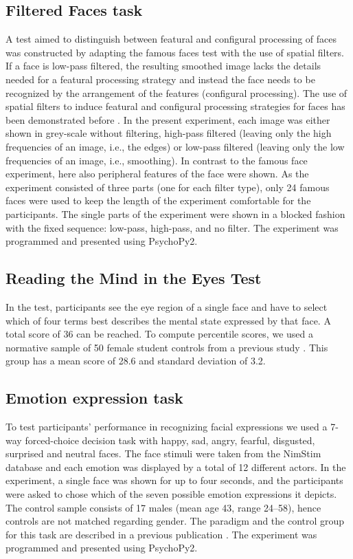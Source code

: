 \documentclass[fleqn,10pt]{SelfArx} %
\begin{document}
\subsection*{Filtered Faces task}
A test aimed to distinguish between featural and configural processing of faces was constructed by adapting the famous faces test with the use of spatial filters. If a face is low-pass filtered, the resulting smoothed image lacks the details needed for a featural processing strategy and instead the face needs to be recognized by the arrangement of the features (configural processing). The use of spatial filters to induce featural and configural processing strategies for faces has been demonstrated before \citep{Goffaux_2005}. In the present experiment, each image was either shown in grey-scale without filtering, high-pass filtered (leaving only the high frequencies of an image, i.e., the edges) or low-pass filtered (leaving only the low frequencies of an image, i.e., smoothing). In contrast to the famous face experiment, here also peripheral features of the face were shown. As the experiment consisted of three parts (one for each filter type), only 24 famous faces were used to keep the length of the experiment comfortable for the participants. The single parts of the experiment were shown in a blocked fashion with the fixed sequence: low-pass, high-pass, and no filter. The experiment was programmed and presented using PsychoPy2.

\subsection*{Reading the Mind in the Eyes Test}
In the test, participants see the eye region of a single face and have to select which of four terms best describes the mental state expressed by that face. A total score of 36 can be reached. To compute percentile scores, we used a normative sample of 50 female student controls from a previous study \citep{Baron_Cohen_2001}. This group has a mean score of 28.6 and standard deviation of 3.2.

\subsection*{Emotion expression task}
To test participants’ performance in recognizing facial expressions we used a 7-way forced-choice decision task with happy, sad, angry, fearful, disgusted, surprised and neutral faces. The face stimuli were taken from the NimStim database \citep{Tottenham_2009} and each emotion was displayed by a total of 12 different actors. In the experiment, a single face was shown for up to four seconds, and the participants were asked to chose which of the seven possible emotion expressions it depicts. The control sample consists of 17 males (mean age 43, range 24–58), hence controls are not matched regarding gender. The paradigm and the control group for this task are described in a previous publication \citep{Wegrzyn_2017}. The experiment was programmed and presented using PsychoPy2.
\end{document}
